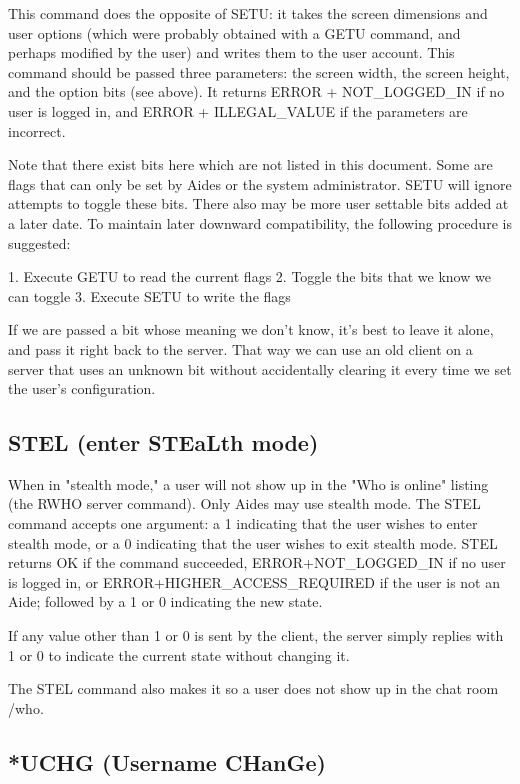  This command does the opposite of SETU: it takes the screen dimensions and
user options (which were probably obtained with a GETU command, and perhaps
modified by the user) and writes them to the user account.  This command
should be passed three parameters: the screen width, the screen height, and
the option bits (see above).  It returns ERROR + NOT_LOGGED_IN if no user is
logged in, and ERROR + ILLEGAL_VALUE if the parameters are incorrect.

 Note that there exist bits here which are not listed in this document.  Some
are flags that can only be set by Aides or the system administrator.  SETU
will ignore attempts to toggle these bits.  There also may be more user
settable bits added at a later date.  To maintain later downward compatibility,
the following procedure is suggested:

 1. Execute GETU to read the current flags
 2. Toggle the bits that we know we can toggle
 3. Execute SETU to write the flags

 If we are passed a bit whose meaning we don't know, it's best to leave it
alone, and pass it right back to the server.  That way we can use an old
client on a server that uses an unknown bit without accidentally clearing
it every time we set the user's configuration.



\subsection{STEL (enter STEaLth mode)}

 When in "stealth mode," a user will not show up in the "Who is online"
listing (the RWHO server command).  Only Aides may use stealth mode.  The
STEL command accepts one argument: a 1 indicating that the user wishes to
enter stealth mode, or a 0 indicating that the user wishes to exit stealth
mode.  STEL returns OK if the command succeeded, ERROR+NOT_LOGGED_IN if no
user is logged in, or ERROR+HIGHER_ACCESS_REQUIRED if the user is not an Aide;
followed by a 1 or 0 indicating the new state.

 If any value other than 1 or 0 is sent by the client, the server simply
replies with 1 or 0 to indicate the current state without changing it.

The STEL command also makes it so a user does not show up in the chat room
/who.



\subsection{*UCHG (Username CHanGe)}

